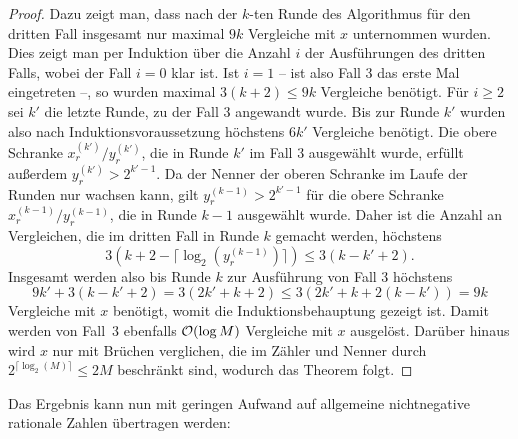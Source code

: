 \begin{proof}
 	Dazu zeigt man, dass nach der $k$-ten Runde des Algorithmus für den dritten Fall insgesamt nur maximal $9k$ Vergleiche mit $x$ unternommen wurden.
 	Dies zeigt man per Induktion über die Anzahl $i$ der Ausführungen des dritten Falls, wobei der Fall $i=0$ klar ist.
 	Ist $i=1$ -- ist also Fall 3 das erste Mal eingetreten --, so wurden maximal $3(k+2) \leq 9k$ Vergleiche benötigt.
 	Für $i\geq2$ sei $k'$ die letzte Runde, zu der Fall 3 angewandt wurde.
 	Bis zur Runde $k'$ wurden also nach Induktionsvoraussetzung höchstens $6k'$ Vergleiche benötigt.
 	Die obere Schranke $x_r^{(k')} / y_r^{(k')}$, die in Runde $k'$ im Fall $3$ ausgewählt wurde, erfüllt außerdem $y_r^{(k')} > 2^{k'-1}$.
 	Da der Nenner der oberen Schranke im Laufe der Runden nur wachsen kann, gilt $y_r^{(k - 1)} > 2^{k'-1}$ für die obere Schranke $x_r^{(k-1)}/y_r^{(k-1)}$, die in Runde $k-1$ ausgewählt wurde.
 	Daher ist die Anzahl an Vergleichen, die im dritten Fall in Runde $k$ gemacht werden, höchstens \[
 	3(k+2-\lceil \log_2(y_r^{(k - 1)})\rceil )\leq 3(k - k' + 2).
 	\]
 	Insgesamt werden also bis Runde $k$ zur Ausführung von Fall 3 höchstens \[
 	9k' + 3(k-k'+2) = 3(2k' + k + 2) \leq 3(2k' + k + 2(k-k')) = 9 k
 	\]
 	Vergleiche mit $x$ benötigt, womit die Induktionsbehauptung gezeigt ist.
 	Damit werden von Fall~3 ebenfalls $\mathcal{O}(\log M)$ Vergleiche mit $x$ ausgelöst.
 	Darüber hinaus wird $x$ nur mit Brüchen verglichen, die im Zähler und Nenner durch $2^{\lceil \log_2(M) \rceil}\leq 2M$ beschränkt sind, wodurch das Theorem folgt.
 \end{proof}

Das Ergebnis kann nun mit geringen Aufwand auf allgemeine nichtnegative rationale Zahlen übertragen werden:


